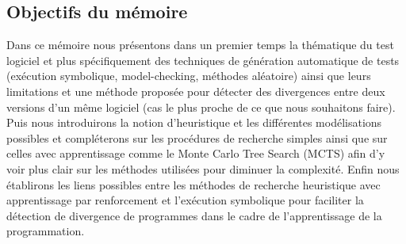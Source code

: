 %
%

\subsection*{Objectifs du mémoire}
Dans ce mémoire nous présentons dans un premier temps la thématique du test logiciel et plus spécifiquement des techniques de génération automatique de tests (exécution symbolique, model-checking, méthodes aléatoire) ainsi que leurs limitations et une méthode proposée pour détecter des divergences entre deux versions d'un même logiciel (cas le plus proche de ce que nous souhaitons faire).
Puis nous introduirons la notion d'heuristique et les différentes modélisations possibles et compléterons sur les procédures de recherche simples ainsi que sur celles avec apprentissage comme le Monte Carlo Tree Search (MCTS) afin d'y voir plus clair sur les méthodes utilisées pour diminuer la complexité.
Enfin nous établirons les liens possibles entre les méthodes de recherche heuristique avec apprentissage par renforcement et l'exécution symbolique pour faciliter la détection de divergence de programmes dans le cadre de l'apprentissage de la programmation.

